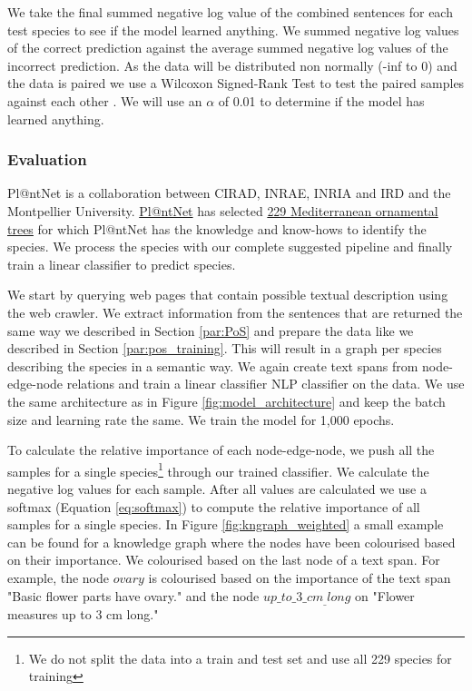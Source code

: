 \documentclass[a4paper, 12pt, oneside]{book} %
\begin{document}
We take the final summed negative log  value of the combined sentences for each test species to see if the model learned anything.
We summed negative log values of the correct prediction against the average summed negative log values of the incorrect prediction.
As the data will be distributed non normally (-inf to 0) and the data is paired we use a Wilcoxon Signed-Rank Test to test the paired samples against each other \autocite{wilcoxon_individual_1945}.
We will use an \(\alpha\) of 0.01 to determine if the model has learned anything. 


\subsubsection{Evaluation}
Pl@ntNet is a collaboration between CIRAD, INRAE, INRIA and IRD and the Montpellier University.
\href{https://identify.plantnet.org/}{Pl@ntNet} has selected \href{https://identify.plantnet.org/monver/species/all}{229 Mediterranean ornamental trees} for which Pl@ntNet has the knowledge and know-hows to identify the species. 
We process the species with our complete suggested pipeline and finally train a linear classifier to predict species.

We start by querying web pages that contain possible textual description using the web crawler.
We extract information from the sentences that are returned the same way we described in Section \ref{par:PoS} and prepare the data like we described in Section \ref{par:pos_training}.
This will result in a graph per species describing the species in a semantic way.
We again create text spans from node-edge-node relations and train a linear classifier NLP classifier on the data.
We use the same architecture as in Figure \ref{fig:model_architecture} and keep the batch size and learning rate the same.
We train the model for 1,000 epochs.

To calculate the relative importance of each node-edge-node, we push all the samples for a single species\footnote{We do not split the data into a train and test set and use all 229 species for training} through our trained classifier.
We calculate the negative log values for each sample.
After all values are calculated we use a softmax (Equation \ref{eq:softmax}) to compute the relative importance of all samples for a single species.
In Figure \ref{fig:kngraph_weighted} a small example can be found for a knowledge graph where the nodes have been colourised based on their importance.
We colourised based on the last node of a text span.
For example, the node $ovary$ is colourised based on the importance of the text span "Basic flower parts have ovary." and the node $up\_to\_3\_cm_\_long$ on "Flower measures up to 3 cm long."
\end{document}
